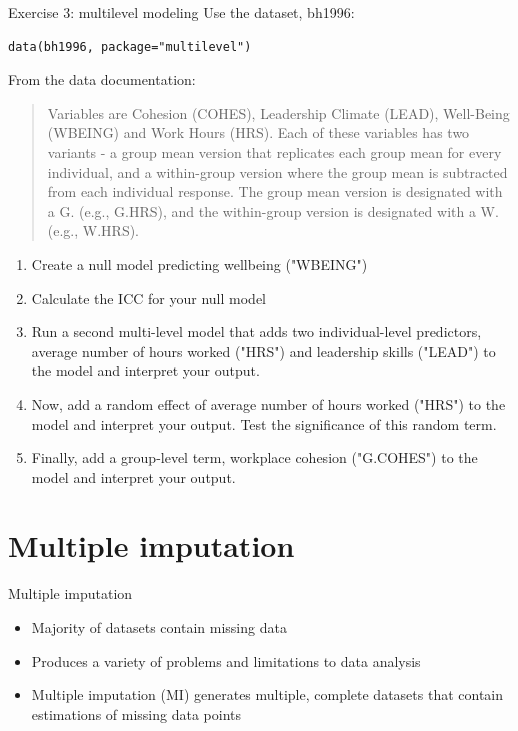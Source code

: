 \documentclass[table,smaller]{beamer}
\begin{document}
\begin{frame}[fragile,label=sec-5-8]{Exercise 3: multilevel modeling}
 Use the dataset, bh1996:
\begin{verbatim}
data(bh1996, package="multilevel")
\end{verbatim}

From the data documentation:
\begin{quote}
Variables are Cohesion (COHES), Leadership Climate (LEAD),
Well-Being (WBEING) and Work Hours (HRS).  Each of these variables
has two variants - a group mean version that replicates each group
mean for every individual, and a within-group version where the
group mean is subtracted from each individual response.  The group
mean version is designated with a G. (e.g., G.HRS), and the
within-group version is designated with a W. (e.g., W.HRS).
\end{quote}

\begin{enumerate}
\item Create a null model predicting wellbeing ("WBEING")
\item Calculate the ICC for your null model
\item Run a second multi-level model that adds two individual-level predictors, average number of hours worked ("HRS") and leadership skills ("LEAD") to the model and interpret your output.
\item Now, add a random effect of average number of hours worked ("HRS") to the model and interpret your output.  Test the significance of this random term.
\item Finally, add a group-level term, workplace cohesion ("G.COHES") to the model and interpret your output.
\end{enumerate}
\end{frame}


\section{Multiple imputation}
\label{sec-6}

\begin{frame}[label=sec-6-1]{Multiple imputation}
\begin{itemize}
\item Majority of datasets contain missing data
\item Produces a variety of problems and limitations to data analysis
\item Multiple imputation (MI) generates multiple, complete datasets that contain estimations of missing data points
\end{itemize}
\end{frame}
\end{document}
